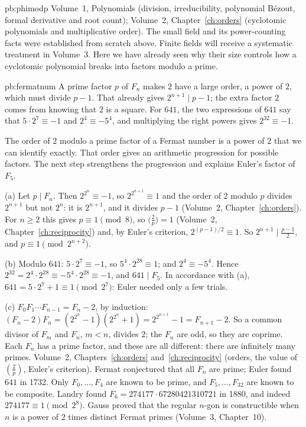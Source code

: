 \begin{solution}{pb:phimodp}
\tools Volume~1, Polynomials (division, irreducibility,
polynomial B\'ezout, formal derivative and root count);
Volume~2, Chapter~\ref{ch:orders} (cyclotomic polynomials
and multiplicative order). The small field and its
power-counting facts were established from scratch above.
\leads Finite fields will receive a systematic
treatment in Volume~3. Here we have already seen
why their size controls how a cyclotomic polynomial
breaks into factors modulo a prime.
\end{solution}

\begin{solution}{pb:fermatnum}
\idea A prime factor $p$ of $F_n$ makes $2$ have a large order, a power of $2$, which must divide $p-1$. That already gives
$2^{n+1}\mid p-1$; the extra factor $2$ comes from knowing that $2$ is a square. For $641$, the two expressions of $641$ say
that $5\cdot2^7\equiv-1$ and $2^4\equiv-5^4$, and multiplying the right powers gives $2^{32}\equiv-1$.

\writeup
The order of $2$ modulo a prime factor of a Fermat number is a power of $2$ that we can identify exactly. That order gives an arithmetic progression for possible factors. The next step strengthens the progression and explains Euler's factor of $F_5$.

 (a) Let $p\mid F_n$. Then $2^{2^n}\equiv-1$, so $2^{2^{n+1}}\equiv1$ and the order of $2$ modulo $p$ divides $2^{n+1}$ but
not $2^n$: it is $2^{n+1}$, and it divides $p-1$ (Volume~2, Chapter~\ref{ch:orders}). For $n\ge2$ this gives $p\equiv1\pmod8$, so
$\bigl(\frac2p\bigr)=1$ (Volume~2, Chapter~\ref{ch:reciprocity}) and, by Euler's criterion, $2^{(p-1)/2}\equiv1$. So $2^{n+1}\mid\frac{p-1}2$, and
$p\equiv1\pmod{2^{n+2}}$.

(b) Modulo $641$: $5\cdot2^7\equiv-1$, so $5^4\cdot2^{28}\equiv1$; and $2^4\equiv-5^4$. Hence
$2^{32}=2^4\cdot2^{28}\equiv-5^4\cdot2^{28}\equiv-1$, and $641\mid F_5$. In accordance with (a), $641=5\cdot2^7+1\equiv1\pmod{2^7}$: Euler
needed only a few trials.

(c) $F_0F_1\cdots F_{n-1}=F_n-2$, by induction: $(F_n-2)F_n=(2^{2^n}-1)(2^{2^n}+1)=2^{2^{n+1}}-1=F_{n+1}-2$. So a common divisor
of $F_m$ and $F_n$, $m<n$, divides $2$; the $F_n$ are odd, so they are coprime. Each $F_n$ has a prime factor, and these are
all different: there are infinitely many primes.
\tools Volume~2, Chapters~\ref{ch:orders} and~\ref{ch:reciprocity} (orders, the value of $(\frac2p)$, Euler's criterion).
\leads Fermat conjectured that all $F_n$ are prime; Euler found $641$ in 1732. Only $F_0,\dots,F_4$ are known to be prime,
and $F_5,\dots,F_{32}$ are known to be composite. Landry found $F_6=274177\cdot67280421310721$ in 1880, and indeed
$274177\equiv1\pmod{2^8}$. Gauss proved that the regular $n$-gon is constructible when $n$ is a power of $2$ times distinct Fermat
primes (Volume~3, Chapter~10).
\end{solution}

